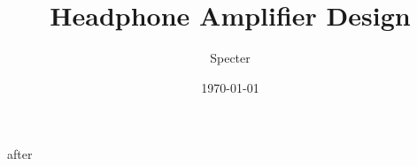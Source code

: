 \documentclass[12pt,a4paper]{report}
\title{  Headphone Amplifier Design	 }
\author{Specter}
\date{\today}
\begin{document}


after
	
	
\end{document}
